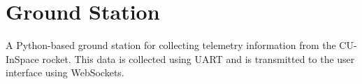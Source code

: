 \sectionfont{\fontsize{14}{14}\selectfont}
\section{Ground Station}

A Python-based ground station for collecting telemetry information from the CU-InSpace rocket. 
This data is collected using UART and is transmitted to the user interface using WebSockets.



